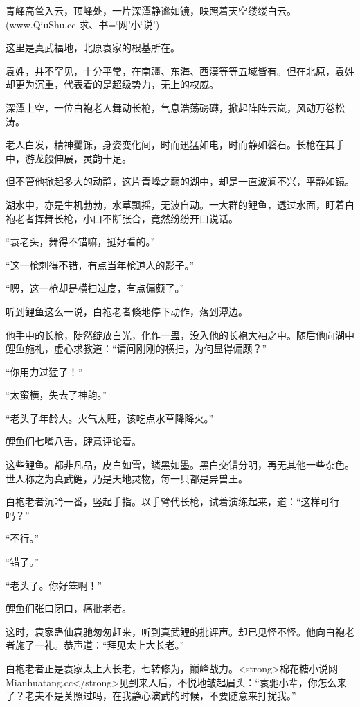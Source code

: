 
\begin{this_body}

青峰高耸入云，顶峰处，一片深潭静谧如镜，映照着天空缕缕白云。(www.QiuShu.cc 求、书=‘网’小‘说’)

这里是真武福地，北原袁家的根基所在。

袁姓，并不罕见，十分平常，在南疆、东海、西漠等等五域皆有。但在北原，袁姓却更为沉重，代表着的是超级势力，无上的权威。

深潭上空，一位白袍老人舞动长枪，气息浩荡磅礴，掀起阵阵云岚，风动万卷松涛。

老人白发，精神矍铄，身姿变化间，时而迅猛如电，时而静如磐石。长枪在其手中，游龙般伸展，灵韵十足。

但不管他掀起多大的动静，这片青峰之巅的湖中，却是一直波澜不兴，平静如镜。

湖水中，亦是生机勃勃，水草飘摇，无波自动。一大群的鲤鱼，透过水面，盯着白袍老者挥舞长枪，小口不断张合，竟然纷纷开口说话。

“袁老头，舞得不错嘛，挺好看的。”

“这一枪刺得不错，有点当年枪道人的影子。”

“嗯，这一枪却是横扫过度，有点偏颇了。”

听到鲤鱼这么一说，白袍老者倏地停下动作，落到潭边。

他手中的长枪，陡然绽放白光，化作一蛊，没入他的长袍大袖之中。随后他向湖中鲤鱼施礼，虚心求教道：“请问刚刚的横扫，为何显得偏颇？”

“你用力过猛了！”

“太蛮横，失去了神韵。”

“老头子年龄大。火气太旺，该吃点水草降降火。”

鲤鱼们七嘴八舌，肆意评论着。

这些鲤鱼。都非凡品，皮白如雪，鳞黑如墨。黑白交错分明，再无其他一些杂色。世人称之为真武鲤，乃是天地灵物，每一只都是异兽王。

白袍老者沉吟一番，竖起手指。以手臂代长枪，试着演练起来，道：“这样可行吗？”

“不行。”

“错了。”

“老头子。你好笨啊！”

鲤鱼们张口闭口，痛批老者。

这时，袁家蛊仙袁驰匆匆赶来，听到真武鲤的批评声。却已见怪不怪。他向白袍老者施了一礼。恭声道：“拜见太上大长老。”

白袍老者正是袁家太上大长老，七转修为，巅峰战力。<strong>棉花糖小说网Mianhuatang.cc</strong>见到来人后，不悦地皱起眉头：“袁驰小辈，你怎么来了？老夫不是关照过吗，在我静心演武的时候，不要随意来打扰我。”


\end{this_body}
